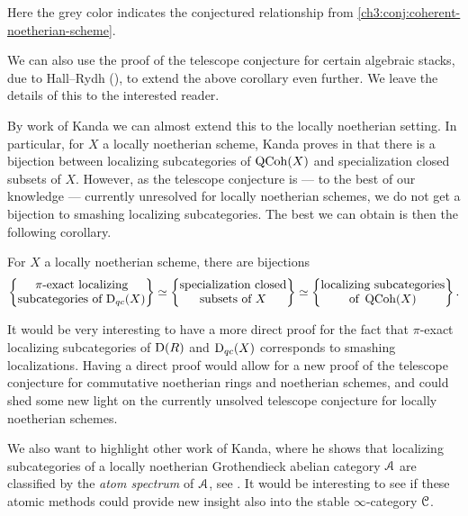 Here the grey color indicates the conjectured relationship from \cref{ch3:conj:coherent-noetherian-scheme}. 

We can also use the proof of the telescope conjecture for certain algebraic stacks, due to Hall--Rydh (\cite{hall-rydh_2017}), to extend the above corollary even further. We leave the details of this to the interested reader. 

By work of Kanda we can almost extend this to the locally noetherian setting. In particular, for $X$ a locally noetherian scheme, Kanda proves in \cite[1.4]{kanda_2015} that there is a bijection between localizing subcategories of $\operatorname{QCoh}(X)$ and specialization closed subsets of $X$. However, as the telescope conjecture is --- to the best of our knowledge --- currently unresolved for locally noetherian schemes, we do not get a bijection to smashing localizing subcategories. The best we can obtain is then the following corollary. 

\begin{corollary}
    For $X$ a locally noetherian scheme, there are bijections
    \[\left\{ \begin{matrix} \pi\text{-exact localizing}\\ \text{subcategories of }\mathrm{D}_{qc}(X) \end{matrix} \right\}\simeq \left\{ \begin{matrix} \text{specialization closed}\\ \text{subsets of }X \end{matrix} \right\} \simeq \left\{ \begin{matrix} \text{localizing subcategories}\\ \text{of }\operatorname{QCoh}(X) \end{matrix} \right\}.\]
\end{corollary}

\begin{remark}
    It would be very interesting to have a more direct proof for the fact that $\pi$-exact localizing subcategories of $\mathrm{D}(R)$ and $\mathrm{D}_{qc}(X)$ corresponds to smashing localizations. Having a direct proof would allow for a new proof of the telescope conjecture for commutative noetherian rings and noetherian schemes, and could shed some new light on the currently unsolved telescope conjecture for locally noetherian schemes. 
\end{remark}

\begin{remark}
    We also want to highlight other work of Kanda, where he shows that localizing subcategories of a locally noetherian Grothendieck abelian category $\EuScript{A}$ are classified by the \emph{atom spectrum} of $\EuScript{A}$, see \cite[5.5]{kanda_classifying_2012}. It would be interesting to see if these atomic methods could provide new insight also into the stable $\infty$-category $\EuScript{C}$. 
\end{remark}







